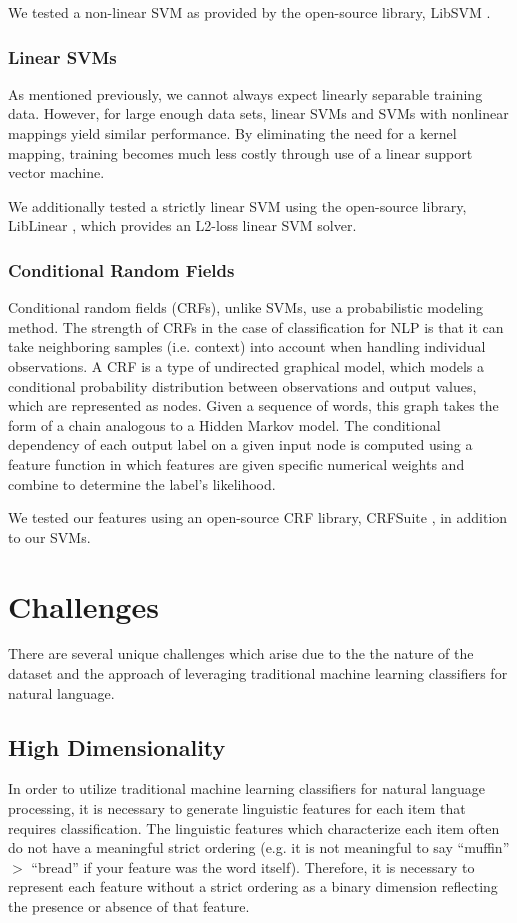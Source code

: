 \documentclass[preprint]{style}
\begin{document}
We tested a non-linear SVM as provided by the open-source library, LibSVM \cite{libsvm}.

\subsubsection{Linear SVMs}
As mentioned previously, we cannot always expect linearly separable training data. However, for large enough data sets, linear SVMs and SVMs with nonlinear mappings yield similar performance. By eliminating the need for a kernel mapping, training becomes much less costly through use of a linear support vector machine. 

We additionally tested a strictly linear SVM using the open-source library, LibLinear \cite{liblinear}, which provides an L2-loss linear SVM solver.

\subsubsection{Conditional Random Fields}
Conditional random fields (CRFs), unlike SVMs, use a probabilistic modeling method. The strength of CRFs in the case of classification for NLP is that it can take neighboring samples (i.e. context) into account when handling individual observations. A CRF is a type of undirected graphical model, which models a conditional probability distribution between observations and output values, which are represented as nodes. Given a sequence of words, this graph takes the form of a chain analogous to a Hidden Markov model. The conditional dependency of each output label on a given input node is computed using a feature function in which features are given specific numerical weights and combine to determine the label's likelihood. 

We tested our features using an open-source CRF library, CRFSuite \cite{crfsuite}, in addition to our SVMs.

\section{Challenges}
There are several unique challenges which arise due to the the nature of the dataset and the approach of leveraging traditional machine learning classifiers for natural language.

\subsection{High Dimensionality}
In order to utilize traditional machine learning classifiers for natural language processing, it is necessary to generate linguistic features for each item that requires classification. The linguistic features which characterize each item often do not have a meaningful strict ordering (e.g. it is not meaningful to say ``muffin'' $>$ ``bread'' if your feature was the word itself). Therefore, it is necessary to represent each feature without a strict ordering as a binary dimension reflecting the presence or absence of that feature.
\end{document}
